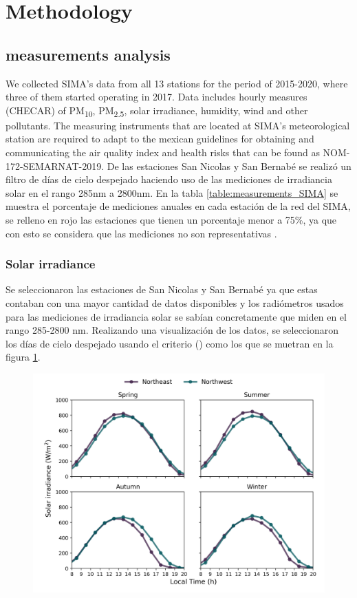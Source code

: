 \section{Methodology}
\subsection{measurements analysis}
We collected SIMA’s data from all 13 stations for the period of 2015-2020, where three of them
started operating in 2017. Data includes hourly measures (CHECAR) of PM\textsubscript{10}, PM\textsubscript{2.5},
solar irradiance, humidity, wind and other pollutants. The measuring instruments that are located at SIMA’s
meteorological station are required to adapt to the mexican guidelines for obtaining and communicating the
air quality index and health risks that can be found as NOM-172-SEMARNAT-2019. De las estaciones San Nicolas
y San Bernabé se realizó un filtro de días de cielo despejado haciendo uso de las mediciones de irradiancia
solar en el rango 285nm a 2800nm. En la tabla \ref{table:measurements_SIMA} se muestra el porcentaje de mediciones anuales en cada estación de la red 
del SIMA, se relleno en rojo las estaciones que tienen un porcentaje menor a 75\%, ya que con esto se considera que
las mediciones no son representativas \cite{molina2019}.

\subsubsection{Solar irradiance}
Se seleccionaron las estaciones de San Nicolas y San Bernabé ya que estas contaban con una mayor cantidad de datos disponibles
y los radiómetros usados para las mediciones de irradiancia solar se sabían concretamente que miden en el rango 285-2800 nm.
Realizando una visualización de los datos, se seleccionaron los días de cielo despejado usando el criterio ()
como los que se muetran en la figura \ref{fig:clear_days}.
\begin{figure}[H]
    \centering
    \includegraphics[scale=0.5]{images/Clear_days.png}
    \caption{}
    \label{fig:clear_days}
\end{figure}
